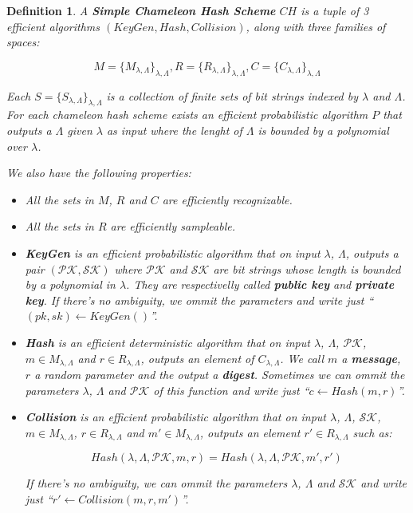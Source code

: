 \documentclass[a4paper]{article}
\newtheorem{definicao}{Definition}
\begin{document}
    \begin{definicao}
    A \textbf{Simple Chameleon Hash Scheme} $CH$ is a tuple of 3 efficient algorithms $(KeyGen, Hash, Collision)$, along with three families of spaces:
    
    $$
    M=\{M_{\lambda,\Lambda}\}_{\lambda,\Lambda}, R=\{R_{\lambda,\Lambda}\}_{\lambda,\Lambda},
    C=\{C_{\lambda,\Lambda}\}_{\lambda,\Lambda}
    $$
    
    Each $S=\{S_{\lambda,\Lambda}\}_{\lambda,\Lambda}$ is a collection
    of finite sets of bit strings indexed by $\lambda$ and $\Lambda$.
    For each chameleon hash scheme exists an efficient probabilistic
    algorithm $P$ that outputs a $\Lambda$ given $\lambda$ as input where
    the lenght of $\Lambda$ is bounded by a polynomial over $\lambda$.
    
    We also have the following properties:
    
    \begin{itemize}
    \item All the sets in $M$, $R$ and $C$ are efficiently recognizable.
    \item All the sets in $R$ are efficiently sampleable.
    \item\textbf{KeyGen} is an efficient probabilistic algorithm that on
    input $\lambda$,
    $\Lambda$, outputs a pair $(\mathcal{PK}, \mathcal{SK})$ where
    $\mathcal{PK}$
    and $\mathcal{SK}$ are bit strings whose length is bounded by a
    polynomial in
    $\lambda$. They are respectivelly called \textbf{public key} and 
    \textbf{private key}. If there's no ambiguity, we ommit the
    parameters and write just ``$(pk, sk) \leftarrow KeyGen()$''.
    \item\textbf{Hash} is an efficient deterministic algorithm that on
    input
    $\lambda$, $\Lambda$, $\mathcal{PK}$, $m \in M_{\lambda,\Lambda}$ and
    $r \in R_{\lambda,\Lambda}$, outputs an element of
    $C_{\lambda,\Lambda}$.
    We call $m$ a \textbf{message}, $r$ a random parameter and the output
    a \textbf{digest}. Sometimes we can ommit the parameters $\lambda$,
    $\Lambda$ and $\mathcal{PK}$ of this function and write just 
    ``$c \leftarrow Hash(m, r)$''.
    \item\textbf{Collision} is an efficient probabilistic algorithm that
    on input $\lambda$, $\Lambda$, $\mathcal{SK}$, $m \in
    M_{\lambda,\Lambda}$,
    $r \in R_{\lambda,\Lambda}$ and $m' \in M_{\lambda,\Lambda}$, outputs
    an element $r' \in R_{\lambda,\Lambda}$ such as:
    
    $$
    Hash(\lambda, \Lambda, \mathcal{PK}, m, r) = Hash(\lambda, \Lambda, \mathcal{PK}, m', r')
    $$
    
    If there's no ambiguity, we can ommit the parameters $\lambda$,
    $\Lambda$ and $\mathcal{SK}$ and write just ``$r' \leftarrow
    Collision(m, r, m')$''.
    \end{itemize}
    \end{definicao}
    
\end{document}

